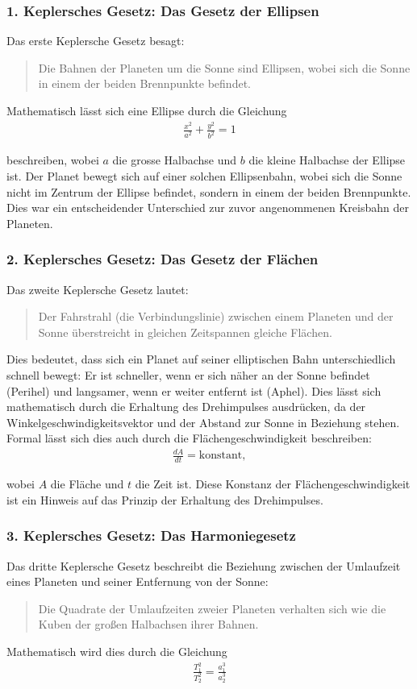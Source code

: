 \documentclass[a4paper,12pt,twoside]{article}
\begin{document}
\subsubsection{1. Keplersches Gesetz: Das Gesetz der Ellipsen}
Das erste Keplersche Gesetz besagt:
\begin{quote}
    Die Bahnen der Planeten um die Sonne sind Ellipsen, wobei sich die Sonne in einem der beiden Brennpunkte befindet.
\end{quote}
Mathematisch lässt sich eine Ellipse durch die Gleichung
\begin{align*}
	\frac{x^2}{a^2} + \frac{y^2}{b^2} = 1
\end{align*}

beschreiben, wobei \(a\) die grosse Halbachse und \(b\) die kleine Halbachse der Ellipse ist. Der Planet bewegt sich auf einer solchen Ellipsenbahn, wobei sich die Sonne nicht im Zentrum der Ellipse befindet, sondern in einem der beiden Brennpunkte. Dies war ein entscheidender Unterschied zur zuvor angenommenen Kreisbahn der Planeten.
\subsubsection{2. Keplersches Gesetz: Das Gesetz der Flächen}
Das zweite Keplersche Gesetz lautet:

\begin{quote}
    Der Fahrstrahl (die Verbindungslinie) zwischen einem Planeten und der Sonne überstreicht in gleichen Zeitspannen gleiche Flächen.
\end{quote}
Dies bedeutet, dass sich ein Planet auf seiner elliptischen Bahn unterschiedlich schnell bewegt: Er ist schneller, wenn er sich näher an der Sonne befindet (Perihel) und langsamer, wenn er weiter entfernt ist (Aphel). Dies lässt sich mathematisch durch die Erhaltung des Drehimpulses ausdrücken, da der Winkelgeschwindigkeitsvektor und der Abstand zur Sonne in Beziehung stehen. Formal lässt sich dies auch durch die Flächengeschwindigkeit beschreiben:
\begin{align*}
	\frac{dA}{dt} = \text{konstant},
\end{align*}

wobei \(A\) die Fläche und \(t\) die Zeit ist. Diese Konstanz der Flächengeschwindigkeit ist ein Hinweis auf das Prinzip der Erhaltung des Drehimpulses.

\subsubsection{3. Keplersches Gesetz: Das Harmoniegesetz}
Das dritte Keplersche Gesetz beschreibt die Beziehung zwischen der Umlaufzeit eines Planeten und seiner Entfernung von der Sonne:
\begin{quote}
    Die Quadrate der Umlaufzeiten zweier Planeten verhalten sich wie die Kuben der großen Halbachsen ihrer Bahnen.
\end{quote}
Mathematisch wird dies durch die Gleichung
\begin{align*}
	\frac{T_1^2}{T_2^2} = \frac{a_1^3}{a_2^3}
\end{align*}
\end{document}
